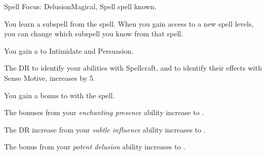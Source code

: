     \begin{feat}{Spell Focus: Delusion}{Magical, Spell}
        \featpre {} spell known.

         You learn a subspell from the  spell.
        When you gain access to a new spell levels, you can change which subspell you know from that spell.

         You gain a   to Intimidate and Persuasion.

         The DR to identify your  abilities with Spellcraft, and to identify their effects with Sense Motive, increases by 5.

         You gain a  bonus to  with the  spell. 

         The bonuses from your \textit{enchanting presence} ability increase to .

         The DR increase from your \textit{subtle influence} ability increases to .

         The bonus from your \textit{potent delusion} ability increases to .
    \end{feat}

